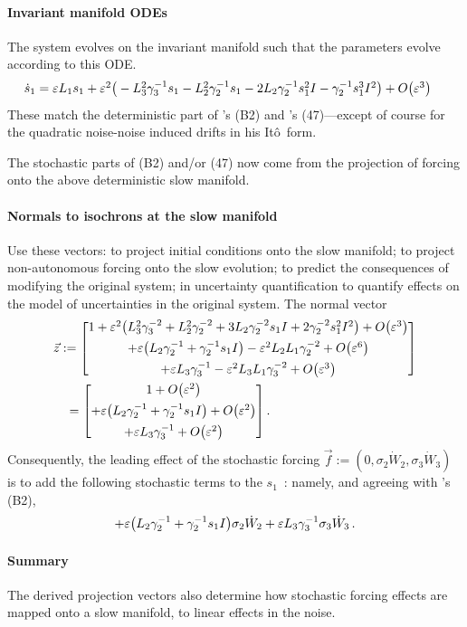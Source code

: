 \paragraph{Invariant manifold ODEs}
The system evolves on the invariant manifold such that the
parameters evolve according to this ODE.
\begin{equation*}
\dot s_{1}=\ParMath{ \eps L_{1} s_{1} +\eps^{2}
\big(-L_{3}^{2} \gamma _{3}^{-1} s_{1}-L_{2}^{2} \gamma
_{2}^{-1} s_{1}-2 L_{2} \gamma _{2}^{-1} s_{1}^{2} I-\gamma
_{2}^{-1} s_{1}^{3} I^{2}\big) +O\big(\varepsilon ^{3}\big)
}
\end{equation*}
These match the deterministic part of \cite{Falasca2025}'s
(B2) and \cite{Majda2010}'s (47)---except of course for 
the quadratic noise-noise induced drifts in his It\^o~form.

The stochastic parts of (B2) and/or (47) now come from the 
projection of forcing onto the above deterministic
slow manifold.

\paragraph{Normals to isochrons at the slow manifold}
Use these vectors: to project initial conditions onto the
slow manifold; to project non-autonomous forcing onto the
slow evolution; to predict the consequences of modifying the
original system; in uncertainty quantification to quantify
effects on the model of uncertainties in the original
system. The normal vector 
\begin{align*}&
\vec z :=
\begin{bmatrix} 
1 +\varepsilon^{2} \big(L_{3}^{2} \gamma _{3}^{-2} +L_{2}^{2}
\gamma _{2}^{-2} +3 L_{2} \gamma _{2}^{-2} s_{1} I +2 \gamma
_{2}^{-2} s_{1}^{2} I^{2}\big) +O\big(\varepsilon ^{3}\big)
\\[1ex]
+\varepsilon \big(L_{2} \gamma _{2}^{-1}+\gamma _{2}^{-1} s_{1}
I\big) -\varepsilon^{2} L_{2} L_{1} \gamma _{2}^{-2}
+O\big(\varepsilon ^{6} \big)
\\[1ex]
+\varepsilon L_{3} \gamma _{3}^{-1} -\varepsilon^{2} L_{3} L_{1}
\gamma _{3}^{-2} +O\big(\varepsilon ^{3}\big)
\end{bmatrix}
\\&\quad{}=
\begin{bmatrix} 
1+O\big(\varepsilon ^{2}\big)
\\[1ex]
+\varepsilon \big(L_{2} \gamma _{2}^{-1}+\gamma _{2}^{-1} s_{1}
I\big) +O\big(\varepsilon ^{2} \big)
\\[1ex]
+\varepsilon L_{3} \gamma _{3}^{-1} +O\big(\varepsilon
^{2}\big)
\end{bmatrix}.
\end{align*}
Consequently, the leading effect of the stochastic forcing
\(\vec f:=(0, \sigma_2\dot W_2, \sigma_3\dot W_3)\) is to
add the following stochastic terms to the \(s_1\)~\ode: 
namely, and agreeing with \cite{Falasca2025}'s (B2),
\begin{equation*}
+\varepsilon \big(L_{2} \gamma _{2}^{-1}+\gamma _{2}^{-1} s_{1}
I\big)\sigma_2\dot W_2 +\varepsilon L_{3} \gamma
_{3}^{-1}\sigma_3\dot W_3\,.
\end{equation*}

\paragraph{Summary}  The derived projection vectors also
determine how stochastic forcing effects are mapped onto a
slow manifold, to linear effects in the noise.
